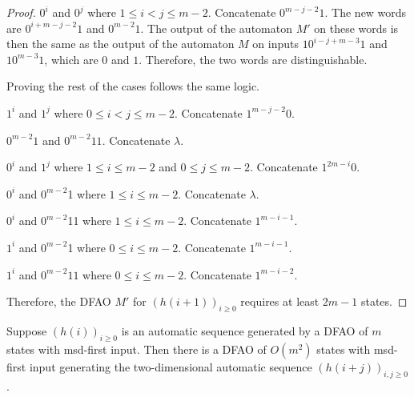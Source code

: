 \documentclass[12pt,reqno]{article}
\begin{document}
\begin{proof}
    \medskip

     $0^i$ and $0^j$ where $1 \leq i < j \leq m-2$.
    Concatenate $0^{m-j-2}1$.
    The new words are $0^{i+m-j -2 }1$ and $0^{m-2}1$.
    The output of the automaton $M'$ on these words is then the same as the output of the automaton $M$ on inputs $1 0^{i-j+m-3}1$ and $1 0^{m-3}1$, which are $0$ and $1$. Therefore, the two words are distinguishable.

    Proving the rest of the cases follows the same logic.

    \medskip

     $1^i$ and $1^j$ where $0 \leq i < j \leq m-2$.
    Concatenate $1^{m-j-2}0$. 

    \medskip

     $0^{m-2}1$ and $0^{m-2}11$.
    Concatenate $\lambda$.

    \medskip

     $0^i$ and $1^j$ where $1 \leq i\leq m-2$ and $0\leq j \leq m-2$. 
    Concatenate $1^{2m-i}0$.

    \medskip

     $0^i$ and $0^{m-2}$1 where $ 1 \leq i \leq m-2$.
    Concatenate $\lambda$.

    \medskip

     $0^i$ and $0^{m-2}$11 where $1 \leq i \leq m-2$.
    Concatenate $1^{m-i-1}$.

    \medskip

     $1^i$ and $0^{m-2}$1 where $0 \leq i \leq m-2$.
    Concatenate $1^{m-i-1}$.

    \medskip

     $1^i$ and $0^{m-2}11$ where $0 \leq i \leq m-2$.
    Concatenate $1^{m-i-2}$.

    \medskip

    \noindent Therefore, the DFAO $M'$ for $(h(i+1))_{i \geq 0}$ requires at least $2m-1$ states.
\end{proof}

\begin{theorem} \label{theorem:h(i+j)}
Suppose $(h(i))_{i \geq 0}$ is an automatic sequence generated by a DFAO of $m$ states with msd-first input.
Then there is a DFAO of $O(m^2)$ states with msd-first input generating the
two-dimensional automatic sequence $(h(i+j))_{i, j \geq 0 }$.
\end{theorem}
\end{document}

